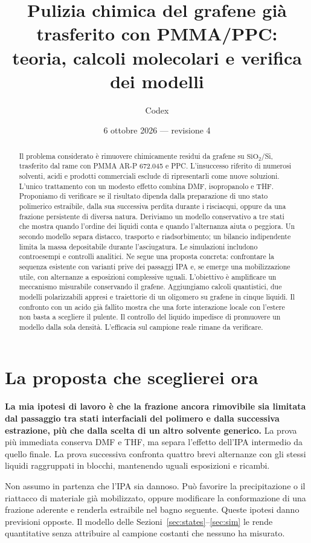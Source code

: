 \documentclass[11pt,reqno]{amsart}
\title[Grafene: teoria e calcoli molecolari della pulizia]{Pulizia chimica del grafene gi\`a trasferito con PMMA/PPC:\\ teoria, calcoli molecolari e verifica dei modelli}
\author{Codex}
\date{6 ottobre 2026 --- revisione 4}
\numberwithin{equation}{section}
\newcommand{\SiO}{\ensuremath{\mathrm{SiO}_2}}
\begin{document}
\begin{abstract}
Il problema considerato \`e rimuovere chimicamente residui da grafene
su \SiO/Si, trasferito dal rame con PMMA AR-P 672.045 e PPC.
L'insuccesso riferito di numerosi solventi, acidi e prodotti commerciali
esclude di ripresentarli come nuove soluzioni. L'unico trattamento con
un modesto effetto combina DMF, isopropanolo e THF. Proponiamo di
verificare se il risultato dipenda dalla preparazione di uno stato
polimerico estraibile, dalla sua successiva perdita durante i
risciacqui, oppure da una frazione persistente di diversa natura.
Deriviamo un modello conservativo a tre stati che mostra quando
l'ordine dei liquidi conta e quando l'alternanza aiuta o peggiora.
Un secondo modello separa distacco, trasporto e riadsorbimento;
un bilancio indipendente limita la massa depositabile durante
l'asciugatura. Le simulazioni includono controesempi e controlli
analitici. Ne segue una proposta concreta: confrontare la sequenza
esistente con varianti prive dei passaggi IPA e, se emerge una
mobilizzazione utile, con alternanze a esposizioni complessive uguali.
L'obiettivo \`e amplificare un meccanismo misurabile conservando il
grafene. Aggiungiamo calcoli quantistici, due modelli polarizzabili appresi e traiettorie di un oligomero su grafene in cinque liquidi. Il confronto con un acido gi\`a fallito mostra che una forte interazione locale con l'estere non basta a scegliere il pulente. Il controllo del liquido impedisce di promuovere un modello dalla sola densit\`a. L'efficacia sul campione reale rimane da verificare.
\end{abstract}
\maketitle

\section{La proposta che sceglierei ora}

\textbf{La mia ipotesi di lavoro \`e che la frazione ancora rimovibile
sia limitata dal passaggio tra stati interfaciali del polimero e dalla
successiva estrazione, pi\`u che dalla scelta di un altro solvente
generico.} La prova pi\`u immediata conserva DMF e THF, ma separa
l'effetto dell'IPA intermedio da quello finale. La prova successiva
confronta quattro brevi alternanze con gli stessi liquidi raggruppati
in blocchi, mantenendo uguali esposizioni e ricambi.

Non assumo in partenza che l'IPA sia dannoso. Pu\`o favorire la
precipitazione o il riattacco di materiale gi\`a mobilizzato, oppure
modificare la conformazione di una frazione aderente e renderla
estraibile nel bagno seguente. Queste ipotesi danno previsioni
opposte. Il modello delle Sezioni~\ref{sec:states}--\ref{sec:sim}
le rende quantitative senza attribuire al campione costanti che
nessuno ha misurato.
\end{document}
